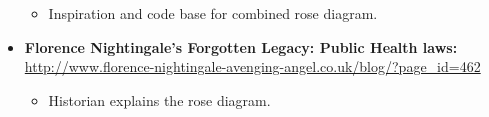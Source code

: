 \documentclass[
  dvipsnames]{article}
\providecommand{\tightlist}{%
  \setlength{\itemsep}{0pt}\setlength{\parskip}{0pt}}
\begin{document}
\begin{itemize}
  \begin{itemize}
  \tightlist
  \item
    Inspiration and code base for combined rose diagram.
  \end{itemize}
\item
  \textbf{Florence Nightingale's Forgotten Legacy: Public Health
  laws:}\\
  \url{http://www.florence-nightingale-avenging-angel.co.uk/blog/?page_id=462}

  \begin{itemize}
  \tightlist
  \item
    Historian explains the rose diagram.
  \end{itemize}
\end{itemize}
\end{document}
